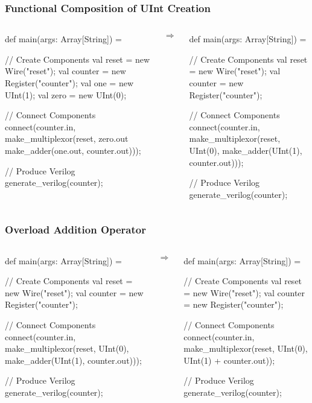 \begin{frame}[fragile]
\frametitle{Functional Composition of UInt Creation}
\begin{columns}
{
\begin{scala}
def main(args: Array[String]) = {
  // Create Components
  val reset   = new Wire("reset");
  val counter = new Register("counter");
  val one     = new UInt(1);
  val zero    = new UInt(0);

  // Connect Components
  connect(counter.in, 
    make_multiplexor(reset,
      zero.out
      make_adder(one.out, counter.out)));

  // Produce Verilog
  generate_verilog(counter);
}
\end{scala}
}
\begin{center}
$\Rightarrow$
\end{center}
{
\begin{scala}
def main(args: Array[String]) = {
  // Create Components
  val reset   = new Wire("reset");
  val counter = new Register("counter");

  // Connect Components
  connect(counter.in, 
    make_multiplexor(reset,
      UInt(0),
      make_adder(UInt(1), counter.out)));

  // Produce Verilog
  generate_verilog(counter);
}
\end{scala}
}
\end{columns}
\end{frame}

\begin{frame}[fragile]
\frametitle{Overload Addition Operator}
\begin{columns}
{
\begin{scala}
def main(args: Array[String]) = {
  // Create Components
  val reset   = new Wire("reset");
  val counter = new Register("counter");

  // Connect Components
  connect(counter.in, 
    make_multiplexor(reset,
      UInt(0),
      make_adder(UInt(1), counter.out)));

  // Produce Verilog
  generate_verilog(counter);
}
\end{scala}
}
\begin{center}
$\Rightarrow$
\end{center}
{
\begin{scala}
def main(args: Array[String]) = {
  // Create Components
  val reset   = new Wire("reset");
  val counter = new Register("counter");

  // Connect Components
  connect(counter.in, 
    make_multiplexor(reset,
      UInt(0),
      UInt(1) + counter.out));

  // Produce Verilog
  generate_verilog(counter);
}
\end{scala}
}
\end{columns}
\end{frame}

